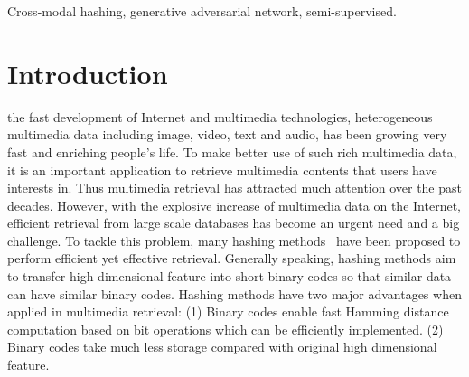 \documentclass[journal]{IEEEtran}
\begin{document}
\begin{IEEEkeywords}
Cross-modal hashing, generative adversarial network, semi-supervised.
\end{IEEEkeywords}






%
\IEEEpeerreviewmaketitle



\section{Introduction}
% 
% 
% 
% 
 the fast development of Internet and multimedia technologies, heterogeneous multimedia data including image, video, text and audio, has been growing very fast and enriching people's life. To make better use of such rich multimedia data, it is an important application to retrieve multimedia contents that users have interests in. Thus multimedia retrieval has attracted much attention over the past decades. However, with the explosive increase of multimedia data on the Internet, efficient retrieval from large scale databases has become an urgent need and a big challenge. To tackle this problem, many hashing methods~\cite{lsh_vldb,agh_icml,imagehashsurvey,llh_cvpr,ninh_cvpr,sdh_cvpr,sh_nips,ssh_cvpr} have been proposed to perform efficient yet effective retrieval. Generally speaking, hashing methods aim to transfer high dimensional feature into short binary codes so that similar data can have similar binary codes. Hashing methods have two major advantages when applied in multimedia retrieval: (1) Binary codes enable fast Hamming distance computation based on bit operations which can be efficiently implemented. (2) Binary codes take much less storage compared with original high dimensional feature. 
\end{document}

